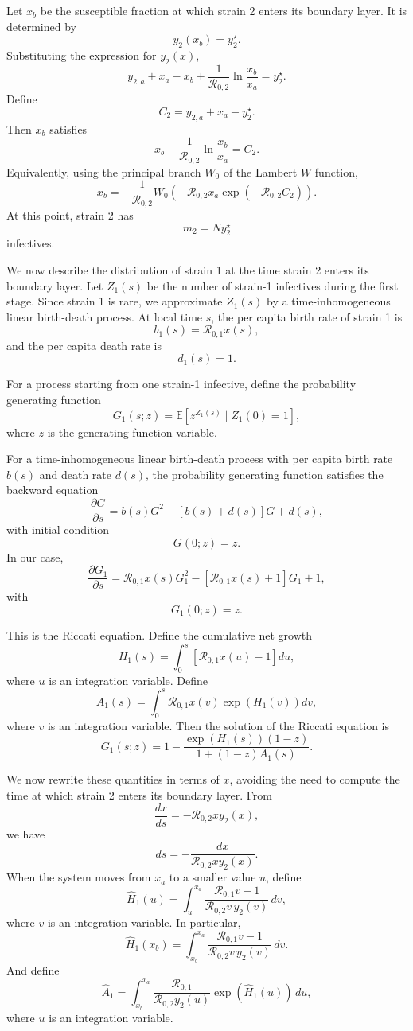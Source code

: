\documentclass[11pt]{article}
\begin{document}
Let \(x_b\) be the susceptible fraction at which strain 2 enters its boundary layer. It is determined by
\[
y_2(x_b)=y_2^\star.
\]
Substituting the expression for \(y_2(x)\),
\[
y_{2,a}+x_a-x_b+\frac{1}{\mathcal R_{0,2}}\ln\frac{x_b}{x_a}
=
y_2^\star.
\]
Define
\[
C_2=y_{2,a}+x_a-y_2^\star.
\]
Then \(x_b\) satisfies
\[
x_b-\frac{1}{\mathcal R_{0,2}}\ln\frac{x_b}{x_a}
=
C_2.
\]
Equivalently, using the principal branch \(W_0\) of the Lambert \(W\) function,
\[
x_b
=
-\frac{1}{\mathcal R_{0,2}}
W_0
\left(
-\mathcal R_{0,2}x_a\exp(-\mathcal R_{0,2}C_2)
\right).
\]
At this point, strain 2 has
\[
m_2=Ny_2^\star
\]
infectives.

We now describe the distribution of strain 1 at the time strain 2 enters its boundary layer. Let \(Z_1(s)\) be the number of strain-1 infectives during the first stage. Since strain 1 is rare, we approximate \(Z_1(s)\) by a time-inhomogeneous linear birth-death process. At local time \(s\), the per capita birth rate of strain 1 is
\[
b_1(s)=\mathcal R_{0,1}x(s),
\]
and the per capita death rate is
\[
d_1(s)=1.
\]

For a process starting from one strain-1 infective, define the probability generating function
\[
G_1(s;z)
=
\mathbb E[z^{Z_1(s)}\mid Z_1(0)=1],
\]
where \(z\) is the generating-function variable.

For a time-inhomogeneous linear birth-death process with per capita birth rate \(b(s)\) and death rate \(d(s)\), the probability generating function satisfies the backward equation
\[
\frac{\partial G}{\partial s}
=
b(s)G^2-[b(s)+d(s)]G+d(s),
\]
with initial condition
\[
G(0;z)=z.
\]
In our case,
\[
\frac{\partial G_1}{\partial s}
=
\mathcal R_{0,1}x(s)G_1^2
-
[\mathcal R_{0,1}x(s)+1]G_1
+
1,
\]
with
\[
G_1(0;z)=z.
\]

This is the Riccati equation. Define the cumulative net growth
\[
H_1(s)
=
\int_0^s[\mathcal R_{0,1}x(u)-1]du,
\]
where \(u\) is an integration variable. Define 
\[
A_1(s)
=
\int_0^s \mathcal R_{0,1}x(v)\exp(H_1(v))dv,
\]
where \(v\) is an integration variable. Then the solution of the Riccati equation is
\[
G_1(s;z)
=
1-
\frac{\exp(H_1(s))(1-z)}
{1+(1-z)A_1(s)}.
\]

We now rewrite these quantities in terms of \(x\), avoiding the need to compute the time at which strain 2 enters its boundary layer. From
\[
\frac{dx}{ds}
=
-\mathcal R_{0,2}xy_2(x),
\]
we have
\[
ds
=
-\frac{dx}{\mathcal R_{0,2}x y_2(x)}.
\]
When the system moves from \(x_a\) to a smaller value \(u\), define
\[
\widehat H_1(u)
=
\int_u^{x_a}
\frac{\mathcal R_{0,1}v-1}
{\mathcal R_{0,2}v\,y_2(v)}
\,dv,
\]
where \(v\) is an integration variable. In particular,
\[
\widehat H_1(x_b)
=
\int_{x_b}^{x_a}
\frac{\mathcal R_{0,1}v-1}
{\mathcal R_{0,2}v\,y_2(v)}
\,dv.
\]
And define
\[
\widehat A_1
=
\int_{x_b}^{x_a}
\frac{\mathcal R_{0,1}}
{\mathcal R_{0,2}y_2(u)}
\exp(\widehat H_1(u))
\,du,
\]
where \(u\) is an integration variable.
\end{document}
